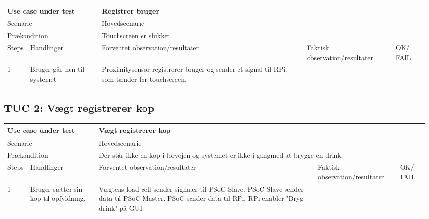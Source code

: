 \begin{table}[H]
\begin{tabular}{|p{1cm}|p{4cm}|p{4cm}|p{4cm}|p{1cm}|}
\hline
\multicolumn{2}{|p{5cm}|}{Use case under test} & \multicolumn{3}{p{9cm}|}{Registrer bruger}                                       \\ \hline
\multicolumn{2}{|p{5cm}|}{Scenarie}            & \multicolumn{3}{p{9cm}|}{Hovedscenarie}                                          \\ \hline
\multicolumn{2}{|p{5cm}|}{Prækondition}        & \multicolumn{3}{p{9cm}|}{Touchscreen er slukket}                                 \\ \hline
Steps               & Handlinger          & Forventet observation/resultater & Faktisk observation/resultater & OK/ FAIL \\ \hline
1    & Bruger går hen til systemet  & Proximitysensor registrerer bruger og sender et signal til RPi, som tænder for touchscreen.  &   &         \\ \hline

\end{tabular}
\end{table}

\subsection{TUC 2: Vægt registrerer kop}

\begin{table}[H]
\begin{tabular}{|p{1cm}|p{4cm}|p{4cm}|p{4cm}|p{1cm}|}
\hline
\multicolumn{2}{|p{5cm}|}{Use case under test} & \multicolumn{3}{p{9cm}|}{Vægt registrerer kop}                                       \\ \hline
\multicolumn{2}{|p{5cm}|}{Scenarie}            & \multicolumn{3}{p{9cm}|}{Hovedscenarie}                                          \\ \hline
\multicolumn{2}{|p{5cm}|}{Prækondition}        & \multicolumn{3}{p{9cm}|}{Der står ikke en kop i forvejen og systemet er ikke i gangmed at brygge en drink.}                                 \\ \hline
Steps               & Handlinger          & Forventet observation/resultater & Faktisk observation/resultater & OK/ FAIL \\ \hline
1    & Bruger sætter sin kop til opfyldning.  &  Vægtens load cell sender signaler til PSoC Slave. PSoC Slave sender data til PSoC Master. PSoC sender data til RPi. RPi enabler "Bryg drink" på GUI. &   &         \\ \hline

\end{tabular}
\end{table}


